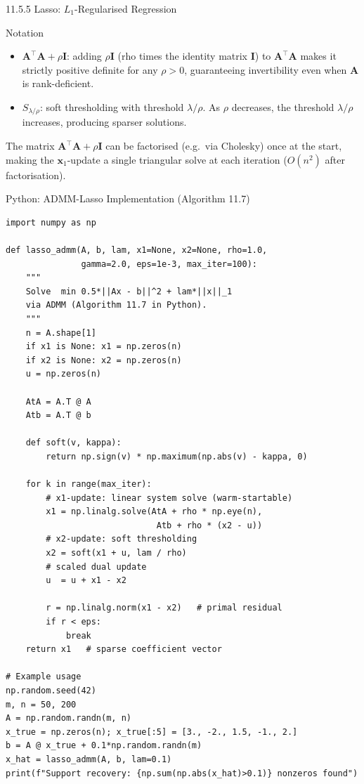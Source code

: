 \documentclass[aspectratio=169,10pt]{beamer}
\newcommand{\bx}{\mathbf{x}}
\newcommand{\bA}{\mathbf{A}}
\newcommand{\bI}{\mathbf{I}}
\begin{document}
\begin{frame}[allowframebreaks]{11.5.5 Lasso: $L_1$-Regularised Regression}
  \begin{block}{Notation}
    \begin{itemize}
      \item $\bA^\top\bA + \rho\bI$: adding $\rho\bI$ (rho times the
            identity matrix $\bI$) to $\bA^\top\bA$ makes it strictly
            positive definite for any $\rho > 0$, guaranteeing
            invertibility even when $\bA$ is rank-deficient.
      \item $S_{\lambda/\rho}$: soft thresholding with threshold $\lambda/\rho$.
            As $\rho$ decreases, the threshold $\lambda/\rho$ increases,
            producing sparser solutions.
    \end{itemize}
  \end{block}

  The matrix $\bA^\top\bA + \rho\bI$ can be factorised (e.g.\ via
  Cholesky) once at the start, making the $\bx_1$-update a single
  triangular solve at each iteration ($O(n^2)$ after factorisation).

\end{frame}

\begin{frame}[fragile]{Python: ADMM-Lasso Implementation (Algorithm 11.7)}
\begin{lstlisting}[style=python]
import numpy as np

def lasso_admm(A, b, lam, x1=None, x2=None, rho=1.0,
               gamma=2.0, eps=1e-3, max_iter=100):
    """
    Solve  min 0.5*||Ax - b||^2 + lam*||x||_1
    via ADMM (Algorithm 11.7 in Python).
    """
    n = A.shape[1]
    if x1 is None: x1 = np.zeros(n)
    if x2 is None: x2 = np.zeros(n)
    u = np.zeros(n)

    AtA = A.T @ A
    Atb = A.T @ b

    def soft(v, kappa):
        return np.sign(v) * np.maximum(np.abs(v) - kappa, 0)

    for k in range(max_iter):
        # x1-update: linear system solve (warm-startable)
        x1 = np.linalg.solve(AtA + rho * np.eye(n),
                              Atb + rho * (x2 - u))
        # x2-update: soft thresholding
        x2 = soft(x1 + u, lam / rho)
        # scaled dual update
        u  = u + x1 - x2

        r = np.linalg.norm(x1 - x2)   # primal residual
        if r < eps:
            break
    return x1   # sparse coefficient vector

# Example usage
np.random.seed(42)
m, n = 50, 200
A = np.random.randn(m, n)
x_true = np.zeros(n); x_true[:5] = [3., -2., 1.5, -1., 2.]
b = A @ x_true + 0.1*np.random.randn(m)
x_hat = lasso_admm(A, b, lam=0.1)
print(f"Support recovery: {np.sum(np.abs(x_hat)>0.1)} nonzeros found")
\end{lstlisting}
\end{frame}
\end{document}
